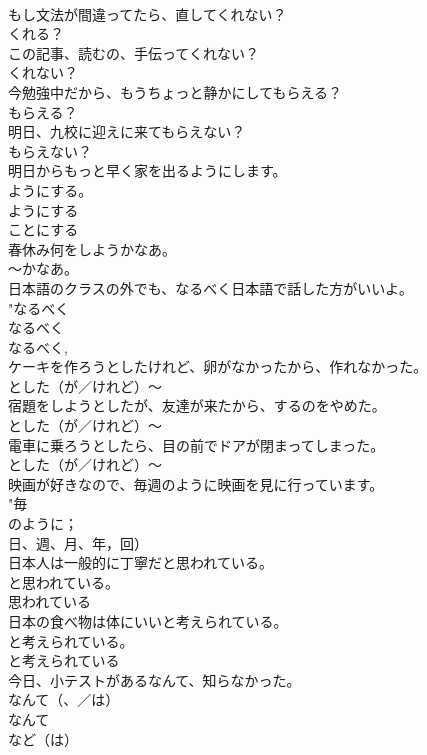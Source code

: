 \documentclass[8pt]{extreport}
\begin{document}
\begin{CJK}{UTF8}{min}
{\\	もし文法が間違ってたら、直してくれない？	
\\	くれる？ 
\\	この記事、読むの、手伝ってくれない？	
\\	くれない？ 
\\	今勉強中だから、もうちょっと静かにしてもらえる？	
\\	もらえる？ 
\\	明日、九校に迎えに来てもらえない？	
\\	もらえない？ 
\\	明日からもっと早く家を出るようにします。	
\\	ようにする。 
\\	ようにする 
\\	ことにする 
\\	春休み何をしようかなあ。	
\\	〜かなあ。 
\\	日本語のクラスの外でも、なるべく日本語で話した方がいいよ。	
\\	"なるべく 
\\	なるべく 
\\	なるべく, 
\\	ケーキを作ろうとしたけれど、卵がなかったから、作れなかった。	
\\	とした（が／けれど）〜 
\\	宿題をしようとしたが、友達が来たから、するのをやめた。	
\\	とした（が／けれど）〜 
\\	電車に乗ろうとしたら、目の前でドアが閉まってしまった。	
\\	とした（が／けれど）〜 
\\	映画が好きなので、毎週のように映画を見に行っています。	
\\	"毎
\\	のように；
\\	日、週、月、年，回） 
\\	日本人は一般的に丁寧だと思われている。	
\\	と思われている。 
\\	思われている　
\\	日本の食べ物は体にいいと考えられている。	
\\	と考えられている。 
\\	と考えられている　
\\	今日、小テストがあるなんて、知らなかった。	
\\	なんて（、／は） 
\\	なんて 
\\	など（は）
}
\end{CJK}
\end{document}
